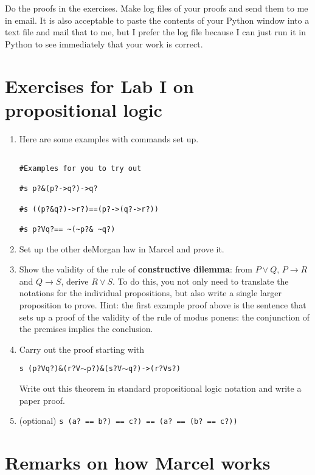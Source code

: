 \documentclass[12pt]{article}
\begin{document}
Do the proofs in the exercises.  Make log files of your proofs and send them to me in email.  It is also acceptable to paste the contents of your Python window into a text file and mail that to me, but I prefer the log file because I can just run it in Python to see immediately that your work is correct.

\section{Exercises for Lab I on propositional logic}

\begin{enumerate}

\item Here are some examples with commands set up.

\begin{verbatim}

#Examples for you to try out

#s p?&(p?->q?)->q?

#s ((p?&q?)->r?)==(p?->(q?->r?))

#s p?Vq?== ~(~p?& ~q?)

\end{verbatim}

\item Set up the other deMorgan law in Marcel and prove it.

\item Show the validity of the rule of {\bf constructive dilemma}:  from $P \vee Q$, $P \rightarrow R$ and $Q \rightarrow S$, derive $R \vee S$.  To do this, you not only need to translate the 
notations for the individual propositions, but also write a single larger proposition to prove.  Hint:  the first example proof above is the sentence
that sets up a proof of the validity of the rule of modus ponens:  the conjunction of the premises implies the conclusion.

\item Carry out the proof starting with 

{\tt s (p?Vq?)\&(r?V$\sim$p?)\&(s?V$\sim$q?)->(r?Vs?)}

Write out this theorem in standard propositional logic notation and write a paper proof.

\item (optional) {\tt s (a? == b?) == c?) == (a? == (b? == c?))}

\end{enumerate}

\section{Remarks on how Marcel works}
\end{document}
